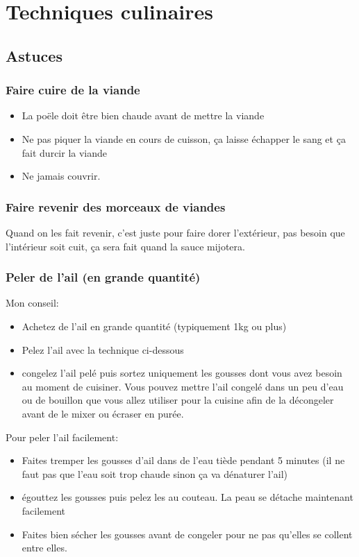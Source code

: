 \documentclass[a4paper,twoside,openright]{report}
\begin{document}
\chapter{Techniques culinaires}
\minitoc
\newpage

\section{Astuces}
\subsection{Faire cuire de la viande}
\begin{itemize}
\item La poële doit être bien chaude avant de mettre la viande
\item Ne pas piquer la viande en cours de cuisson, ça laisse échapper le sang et ça fait durcir la viande
\item Ne jamais couvrir.
\end{itemize}

\subsection{Faire revenir des morceaux de viandes}
Quand on les fait revenir, c'est juste pour faire dorer l'extérieur, pas besoin que l'intérieur soit cuit, ça sera fait quand la sauce mijotera.

\subsection{Peler de l'ail (en grande quantité)}\label{sec:peler_ail}

Mon conseil:
\begin{itemize}
\item Achetez de l'ail en grande quantité (typiquement 1kg ou plus)
\item Pelez l'ail avec la technique ci-dessous
\item congelez l'ail pelé puis sortez uniquement les gousses dont vous avez besoin au moment de cuisiner. Vous pouvez mettre l'ail congelé dans un peu d'eau ou de bouillon que vous allez utiliser pour la cuisine afin de la décongeler avant de le mixer ou écraser en purée. 
\end{itemize}

Pour peler l'ail facilement:
\begin{itemize}
\item Faites tremper les gousses d'ail dans de l'eau tiède pendant 5 minutes (il ne faut pas que l'eau soit trop chaude sinon ça va dénaturer l'ail)
\item égouttez les gousses puis pelez les au couteau. La peau se détache maintenant facilement
\item Faites bien sécher les gousses avant de congeler pour ne pas qu'elles se collent entre elles. 
\end{itemize}
\end{document}
